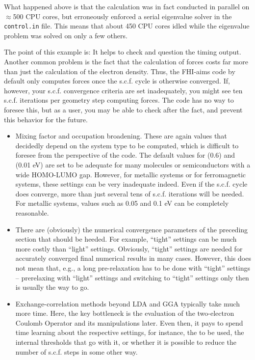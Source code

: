 What happened above is that the calculation was in fact conducted in
parallel on $\approx$500 CPU cores, but erroneously enforced a serial
eigenvalue solver in the \texttt{control.in} file. This means that
about 450 CPU cores idled while the 
eigenvalue problem was solved on only a few others. 

The point of this example is: It helps to check and question the
timing output. Another common problem is the fact that the calculation
of forces costs far more than just the calculation of the electron
density. Thus, the FHI-aims code by default only computes forces once
the s.c.f. cycle is otherwise converged. If, however, your
s.c.f. convergence criteria are set inadequately, you might see ten
s.c.f. iterations per geometry step computing forces. The code has no
way to foresee this, but as a user, you may be able to check after the
fact, and prevent this behavior for the future.

\begin{itemize}
  \item Mixing factor and occupation broadening. These are again
    values that decidedly depend on the system type to be computed,
    which is difficult to foresee from the perspective of the
    code. The default values for  (0.6) and
     (0.01 eV) are set to be adequate for
    many molecules or semiconductors with a wide HOMO-LUMO
    gap. However, for metallic systems or for ferromagnetic systems,
    these settings can be very inadequate indeed. Even if the
    s.c.f. cycle does converge, more than just several tens of
    s.c.f. iterations will be needed. For metallic systems, values
    such as  0.05 and
     0.1 eV can be completely reasonable.
  \item There are (obviously) the numerical convergence parameters of
    the preceding section that should be heeded. For example,
    ``tight'' settings can be much more costly than ``light''
    settings. Obviously, ``tight'' settings are needed for accurately
    converged final numerical results in many cases. However, this
    does not mean that, e.g., a long pre-relaxation has to be done
    with ``tight'' settings -- prerelaxing with ``light'' settings and
    switching to ``tight'' settings only then is usually the way to
    go. 
  \item Exchange-correlation methods beyond LDA and GGA typically take
    much more time. Here, the key bottleneck is the evaluation of the
    two-electron Coulomb Operator and its manipulations later. Even
    then, it pays to spend time learning about the respective
    settings, for instance, the  to be used, the
    internal thresholds that go with it, or whether it is possible to
    reduce the number of s.c.f. steps in some other way. 
\end{itemize}
